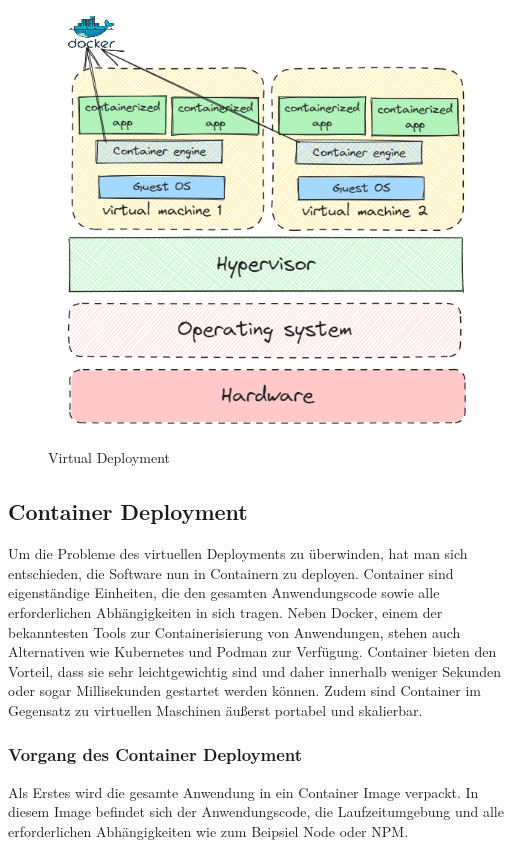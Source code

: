 \begin{figure}[h!]
    \centering
    \includegraphics[width=0.7\linewidth]{pics/virtual-deployment.png}
    \caption{Virtual Deployment}
    \label{fig:enter-label}
    \cite{virtual_grafik}
\end{figure}


\subsection{Container Deployment}
Um die Probleme des virtuellen Deployments zu überwinden, hat man sich entschieden, die Software nun in Containern zu deployen. Container sind eigenständige Einheiten, die den gesamten Anwendungscode sowie alle erforderlichen Abhängigkeiten in sich tragen. Neben Docker, einem der bekanntesten Tools zur Containerisierung von Anwendungen, stehen auch Alternativen wie Kubernetes und Podman zur Verfügung. Container bieten den Vorteil, dass sie sehr leichtgewichtig sind und daher innerhalb weniger Sekunden oder sogar Millisekunden gestartet werden können. Zudem sind Container im Gegensatz zu virtuellen Maschinen äußerst portabel und skalierbar.



\subsubsection{Vorgang des Container Deployment}

Als Erstes wird die gesamte Anwendung in ein Container Image verpackt. In diesem Image befindet sich der Anwendungscode, die Laufzeitumgebung und alle erforderlichen Abhängigkeiten wie zum Beipsiel Node oder NPM.

